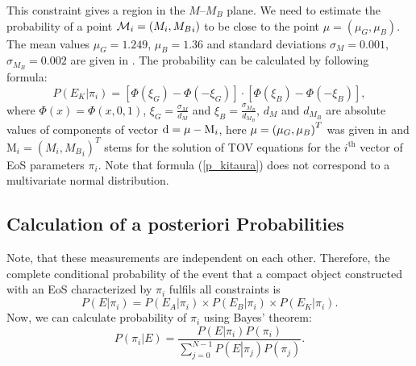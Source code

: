 {This constraint gives a region in the $M$--$M_{B}$ plane.
We need to estimate the probability of a point ${\cal M}_{i}=\left({M}_{i},{M_{B}}_{i}\right)$
to be close to the point $\mu=\left(\mu_{G},\mu_{B}\right)$. The
mean values $\mu_{G}=1.249$, $\mu_{B}=1.36$ and standard deviations
$\sigma_{M}=0.001$, $\sigma_{M_{B}}=0.002$ are given in \cite{Kitaura:2006bt}.
The probability can be calculated by following formula:
\begin{equation}
P\left(E_{K}\left|\pi_{i}\right.\right)=\left[\Phi\left(\xi_{G}\right)-\Phi\left(-\xi_{G}\right)\right]\cdot\left[\Phi\left(\xi_{B}\right)-\Phi\left(-\xi_{B}\right)\right],\label{p_kitaura}
\end{equation}
where $\Phi\left(x\right)=\Phi\left(x,0,1\right)$, $\xi_{G}={\displaystyle \frac{\sigma_{M}}{d_{M}}}$
and $\xi_{B}={\displaystyle \frac{\sigma_{M_{B}}}{d_{M_{B}}}}$, $d_{M}$
and $d_{M_{B}}$ are absolute values of components of vector $\mathrm{{d}}=\mathrm{{\bf \mu}}-\mathrm{{M}}_{i}$,
here $\mathrm{{\bf \mu}}=\left(\mu_{G},\mu_{B}\right)^{T}$ was given
in \cite{Kitaura:2006bt} and $\mathrm{{M}}_{i}=\left({M}_{i},{M_{B}}_{i}\right)^{T}$
stems for the solution of TOV equations for the $i^{\mathrm{th}}$
vector of EoS parameters $\pi_{i}$. Note that formula (\ref{p_kitaura})
does not correspond to a multivariate normal distribution.}


\subsection{Calculation of {a posteriori} Probabilities}

{Note, that these measurements are independent on each other.
Therefore, the complete conditional probability of the event that
a compact object constructed with an EoS characterized by $\pi_{i}$
fulfils all constraints is
\begin{equation}
P\left(E\left|\pi_{i}\right.\right)=P\left(E_{A}\left|\pi_{i}\right.\right)\times P\left(E_{B}\left|\pi_{i}\right.\right)\times P\left(E_{K}\left|\pi_{i}\right.\right).\label{p_event}
\end{equation}
Now, we can calculate probability of $\pi_{i}$ using Bayes' theorem:
\begin{equation}
P\left(\pi_{i}\left|E\right.\right)=\frac{P\left(E\left|\pi_{i}\right.\right)P\left(\pi_{i}\right)}{\sum\limits _{j=0}^{N-1}P\left(E\left|\pi_{j}\right.\right)P\left(\pi_{j}\right)}.\label{pi_apost}
\end{equation}
}
